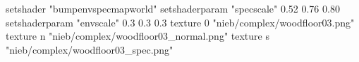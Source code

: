 setshader "bumpenvspecmapworld"
setshaderparam "specscale" 0.52 0.76 0.80
setshaderparam "envscale"  0.3 0.3 0.3
    texture 0 "nieb/complex/woodfloor03.png"
    texture n "nieb/complex/woodfloor03_normal.png"
    texture s "nieb/complex/woodfloor03_spec.png"